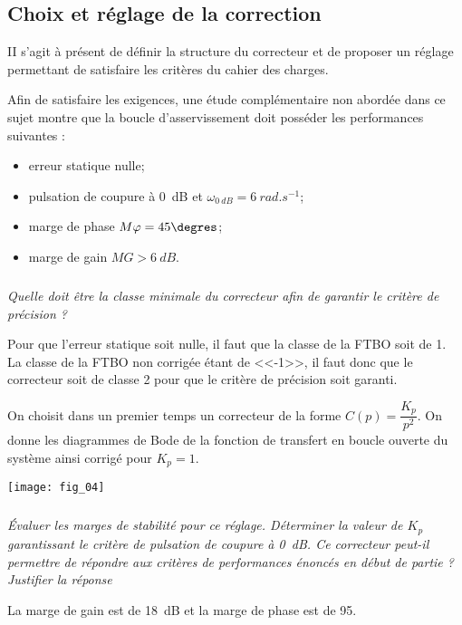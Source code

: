 \begin{multicols}{2}
\begin{multicols}{2}
\subsection*{Choix et réglage de la correction}
\begin{obj}
II s'agit à présent de définir la structure du correcteur et de proposer un réglage permettant de satisfaire les critères du cahier des charges.
\end{obj}
\ifprof
\else
Afin de satisfaire les exigences, une étude complémentaire non abordée dans ce sujet montre que la boucle d'asservissement doit posséder les performances suivantes :
\begin{itemize}
\item erreur statique nulle;
\item pulsation de coupure à \SI{0}{dB} et $\omega_{\SI{0}{dB}}= \SI{6}{rad.s^{-1}}$;
\item marge de phase $M\varphi = 45\degres$;
\item marge de gain $MG > \SI{6}{dB}$.
\end{itemize}
\fi

\subparagraph{}\textit{Quelle doit être la classe minimale du correcteur afin de garantir le critère de précision ?}
\ifprof
\begin{corrige}
Pour que l'erreur statique soit nulle, il faut que la classe de la FTBO soit de 1. La classe de la FTBO non corrigée étant de <<-1>>, il faut donc que le correcteur soit de classe 2 pour que le critère de précision soit garanti.
\end{corrige}
\else
\fi

\ifprof
\else
On choisit dans un premier temps un correcteur de la forme $C(p)=\dfrac{K_p}{p^2}$. On donne les diagrammes de Bode de la fonction de transfert en boucle ouverte du système ainsi corrigé pour $K_p =1$. 

\begin{center}
\texttt{[image: fig\_04]}
\end{center}

\fi

\subparagraph{}\textit{Évaluer les marges de stabilité pour ce réglage. Déterminer la valeur de $K_p$ garantissant le critère de pulsation de coupure à \SI{0}{dB}. Ce correcteur peut-il permettre de répondre aux critères de performances énoncés en début de partie ? Justifier la réponse}
\ifprof
\begin{corrige}
La marge de gain est de \SI{18}{dB} et la marge de phase est de 95\degres. 


\end{corrige}
\end{multicols}
\end{multicols}
